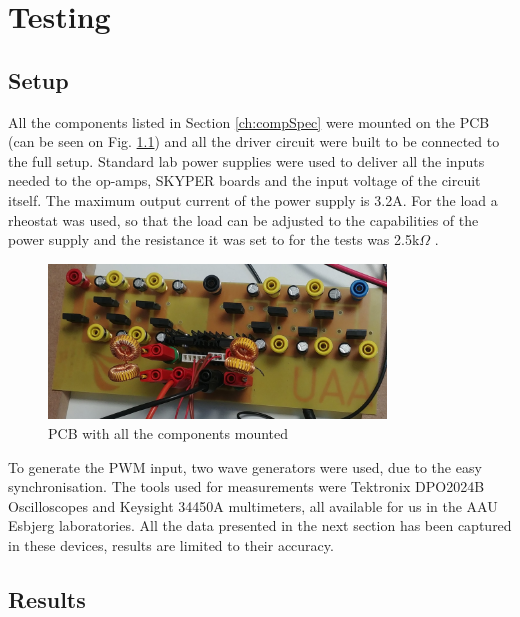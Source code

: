 \chapter{Testing}\label{ch:testing}

\section{Setup}
All the components listed in Section \ref{ch:compSpec} were mounted on the PCB (can be seen on Fig. \ref{fig:SETUP}) and all the driver circuit were built to be connected to the full setup.
Standard lab power supplies were used to deliver all the inputs needed to the op-amps, SKYPER boards and the input voltage of the circuit itself. 
The maximum output current of the power supply is 3.2A.
For the load a rheostat was used, so that the load can be adjusted to the capabilities of the power supply and the resistance it was set to for the tests was 2.5k$\Omega$ . 

\begin{figure}[H]
	\begin{center}
   \includegraphics[width=0.8\textwidth]{figures/06Testing/setup.jpg}
	\end{center}
	\vspace{-4mm}
	\caption{PCB with all the components mounted}
	\label{fig:SETUP}
\end{figure}

To generate the PWM input, two wave generators were used, due to the easy synchronisation. The tools used for measurements were Tektronix DPO2024B Oscilloscopes and Keysight 34450A multimeters, all available for us in the AAU Esbjerg laboratories.
All the data presented in the next section has been captured in these devices, results are limited to their accuracy.
\clearpage
\vspace{-6mm}
\section{Results}

